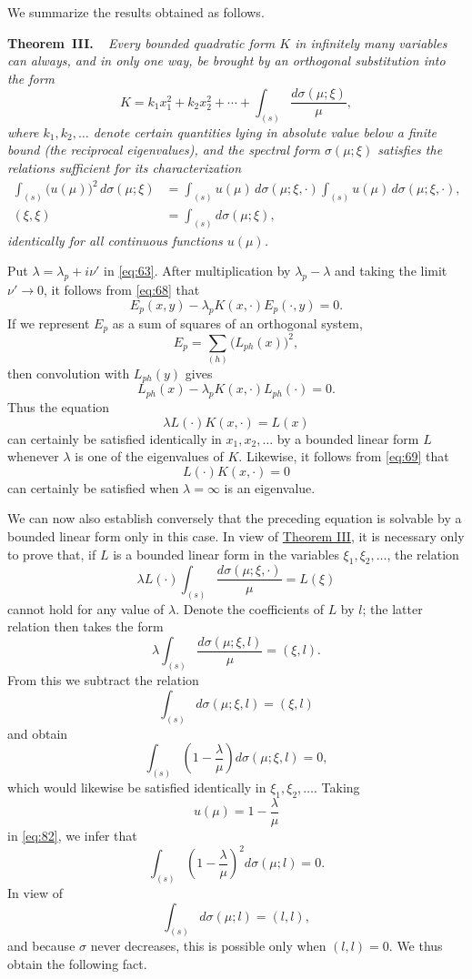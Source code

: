 \documentclass[b5paper,twoside]{article}
\makeatletter
\newcommand{\hilbertstatementname}[2]{%
  \textbf{#1\if\relax\detokenize{#2}\relax\else\ #2\fi.}%
}
\newenvironment{theorem}[1][]{%
  \par\addvspace{.7\baselineskip}%
  \phantomsection
  \protected@edef\@currentlabel{#1}%
  \noindent\hilbertstatementname{Theorem}{#1}\ \itshape\ignorespaces
}{%
  \par\addvspace{.7\baselineskip}%
}
\newcommand{\originalpage}[1]{\phantomsection\label{origpage:#1}}
\makeatother
\begin{document}
We summarize the results obtained as follows.

\begin{theorem}[III]\label{thm:III}
Every bounded quadratic form $K$ in infinitely many variables can always,
and in only one way, be brought by an orthogonal substitution into the form
\[
  K=k_1x_1^2+k_2x_2^2+\cdots
    +\int_{(s)}\frac{d\sigma(\mu;\xi)}{\mu},
\]
where $k_1,k_2,\ldots$ denote certain quantities lying in absolute value
below a finite bound (the reciprocal eigenvalues), and the spectral form
$\sigma(\mu;\xi)$ satisfies the relations sufficient for its characterization
\begin{equation}
\tag{82}\label{eq:82}
\begin{aligned}
  \int_{(s)}\bigl(u(\mu)\bigr)^2\,d\sigma(\mu;\xi)
    &=\int_{(s)}u(\mu)\,d\sigma(\mu;\xi,\mathord{\cdot})
      \int_{(s)}u(\mu)\,d\sigma(\mu;\xi,\mathord{\cdot}),\\
  (\xi,\xi)&=\int_{(s)}d\sigma(\mu;\xi),
\end{aligned}
\end{equation}
identically for all continuous functions $u(\mu)$.
\end{theorem}

Put $\lambda=\lambda_p+i\nu'$ in \eqref{eq:63}.  After multiplication by
$\lambda_p-\lambda$ and taking the limit $\nu'\to0$, it follows from
\eqref{eq:68} that
\[
  E_p(x,y)-\lambda_pK(x,\mathord{\cdot})
  E_p(\mathord{\cdot},y)=0.
\]
If we represent $E_p$ as a sum of squares of an orthogonal system,
\[
  E_p=\sum_{(h)}\bigl(L_{ph}(x)\bigr)^2,
\]
then convolution with $L_{ph}(y)$ gives
\[
  L_{ph}(x)-\lambda_pK(x,\mathord{\cdot})
  L_{ph}(\mathord{\cdot})=0.
\]
Thus the equation
\[
  \lambda L(\mathord{\cdot})K(x,\mathord{\cdot})=L(x)
\]
can certainly be satisfied identically in $x_1,x_2,\ldots$ by a bounded
linear form $L$ whenever $\lambda$ is one of the eigenvalues of $K$.
Likewise, it follows from \eqref{eq:69} that
\[
  L(\mathord{\cdot})K(x,\mathord{\cdot})=0
\]
can certainly be satisfied when $\lambda=\infty$ is an eigenvalue.

We can now also establish conversely that the preceding equation is solvable
by a bounded linear form only in this case.  In view of
\hyperref[thm:III]{Theorem III}, it is necessary only
\originalpage{199}to prove that, if $L$ is a bounded linear form in the
variables $\xi_1,\xi_2,\ldots$, the relation
\[
  \lambda L(\mathord{\cdot})
  \int_{(s)}\frac{d\sigma(\mu;\xi,\mathord{\cdot})}{\mu}=L(\xi)
\]
cannot hold for any value of $\lambda$.  Denote the coefficients of $L$ by
$l$; the latter relation then takes the form
\[
  \lambda\int_{(s)}\frac{d\sigma(\mu;\xi,l)}{\mu}=(\xi,l).
\]
From this we subtract the relation
\[
  \int_{(s)}d\sigma(\mu;\xi,l)=(\xi,l)
\]
and obtain
\[
  \int_{(s)}\left(1-\frac{\lambda}{\mu}\right)
  d\sigma(\mu;\xi,l)=0,
\]
which would likewise be satisfied identically in $\xi_1,\xi_2,\ldots$.
Taking
\[
  u(\mu)=1-\frac{\lambda}{\mu}
\]
in \eqref{eq:82}, we infer that
\[
  \int_{(s)}\left(1-\frac{\lambda}{\mu}\right)^2
  d\sigma(\mu;l)=0.
\]
In view of
\[
  \int_{(s)}d\sigma(\mu;l)=(l,l),
\]
and because $\sigma$ never decreases, this is possible only when
$(l,l)=0$.  We thus obtain the following fact.
\end{document}
